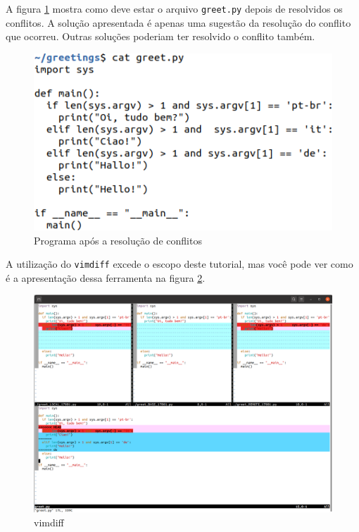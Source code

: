 \documentclass[a4paper]{book}
\begin{document}
A figura \ref{fig:56} mostra como deve estar o
arquivo \texttt{greet.py} depois de resolvidos os conflitos.
A solução apresentada é apenas uma sugestão da
resolução do conflito que ocorreu.
Outras soluções poderiam ter resolvido o conflito 
também.

\begin{figure}[ht]
\caption{Programa após a resolução de conflitos}
\label{fig:56}
\centering
\includegraphics[scale=0.6]{"images/56-Programa após a resolução de conflitos.png"}
\end{figure}

A utilização do \texttt{vimdiff} excede o escopo deste 
tutorial, mas você pode ver como é a apresentação dessa 
ferramenta na figura \ref{fig:57}.

\begin{figure}[h!]
\caption{vimdiff}
\label{fig:57}
\centering
\includegraphics[scale=0.32]{"images/57-vimdiff.png"}
\end{figure}
\end{document}
